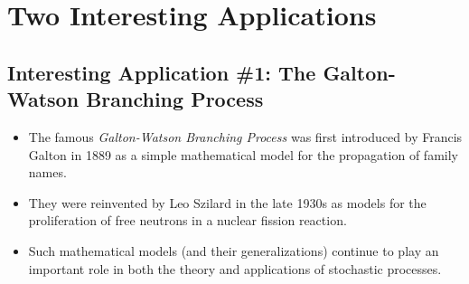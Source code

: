 \section{Two Interesting Applications}
\subsection{Interesting Application \#1: The Galton-Watson Branching Process}
\begin{itemize}
      \item The famous \emph{Galton-Watson Branching Process} was first introduced by Francis Galton in 1889
            as a simple mathematical model for the propagation of family names.
      \item They were reinvented by Leo Szilard in the late 1930s as models for the proliferation of free
            neutrons in a nuclear fission reaction.
      \item Such mathematical models (and their generalizations) continue to play an important role in
            both the theory and applications of stochastic processes.
\end{itemize}
